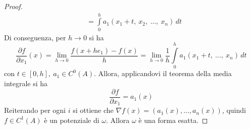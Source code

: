\begin{proof}
\begin{equation}
\begin{aligned}
    &=\int\limits_{0}^{h}{a_1(x_1+t,\ x_2,\ \dots,\  x_n)}\, dt
\end{aligned}
\end{equation}
Di conseguenza, per $h \to 0$ si ha  
\begin{equation}
    \frac{\partial{f}}{\partial x_1}{(x)}= \lim_{h\to 0}{\frac{f(x+he_1)-f(x)}{h}}= \lim_{h \to 0} \frac{1}{h}{\int\limits_{0}^{h}{a_1(x_1+t,\ \dots,\ x_n)}\, dt}
\end{equation}
con $t \in [0, h],\ a_1 \in C^0(A)$. Allora, applicandovi il teorema della media integrale si ha 
\begin{equation}    
     \frac{\partial{f}}{\partial x_1}=a_1(x)
\end{equation}
Reiterando per ogni $i$ si ottiene che $\nabla f(x)= (a_1(x), \dots, a_n(x))$, quindi $f \in C^1(A)$ è un potenziale di $\omega$. Allora $\omega$ è una forma esatta. 
\end{proof}

